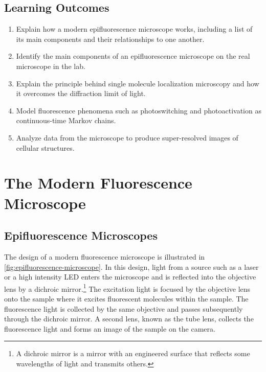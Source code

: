 \documentclass[10pt,a4paper,oneside]{book}
\begin{document}
\section{Learning Outcomes}

\begin{enumerate}
    \item Explain how a modern epifluorescence microscope works, including a list of its main components and their relationships to one another.
    \item Identify the main components of an epifluorescence microscope on the real microscope in the lab.
    \item Explain the principle behind single molecule localization microscopy and how it overcomes the diffraction limit of light.
    \item Model fluorescence phenomena such as photoswitching and photoactivation as continuous-time Markov chains.
    \item Analyze data from the microscope to produce super-resolved images of cellular structures.
\end{enumerate}

\chapter{The Modern Fluorescence Microscope} \label{ch:microscopes}

\section{Epifluorescence Microscopes}

The design of a modern fluorescence microscope is illustrated in \autoref{fig:epifluorescence-microscope}. In this design, light from a source such as a laser or a high intensity LED enters the microscope and is reflected into the objective lens by a dichroic mirror.\footnote{A dichroic mirror is a mirror with an engineered surface that reflects some wavelengths of light and transmits others.} The excitation light is focused by the objective lens onto the sample where it excites fluorescent molecules within the sample. The fluorescence light is collected by the same objective and passes subsequently through the dichroic mirror. A second lens, known as the tube lens, collects the fluorescence light and forms an image of the sample on the camera.
\end{document}
